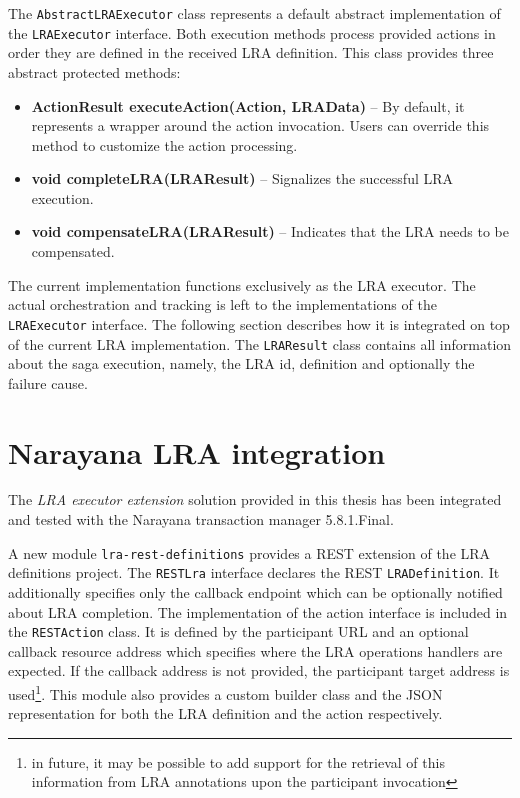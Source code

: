 \documentclass[oneside,
  digital, %
  table,   %
  lof,     %
  lot,     %
]{fithesis3}
\begin{document}
The \texttt{AbstractLRAExecutor} class represents a default abstract implementation of the \texttt{LRAExecutor} interface. Both execution methods process provided actions in order they are defined in the received LRA definition. This class provides three abstract protected methods:

\begin{itemize}
    \item \textbf{ActionResult executeAction(Action, LRAData)} -- By default, it represents a wrapper around the action invocation. Users can override this method to customize the action processing.
    
    \item \textbf{void completeLRA(LRAResult)} -- Signalizes the successful LRA execution.
    
    \item \textbf{void compensateLRA(LRAResult)} -- Indicates that the LRA needs to be compensated.
\end{itemize}

The current implementation functions exclusively as the LRA executor. The actual orchestration and tracking is left to the implementations of the \texttt{LRAExecutor} interface. The following section describes how it is integrated on top of the current LRA implementation. The \texttt{LRAResult} class contains all information about the saga execution, namely, the LRA id, definition and optionally the failure cause.

\section{Narayana LRA integration}
\label{sec:narayana-lra-integration}

The \textit{LRA executor extension} solution provided in this thesis has been integrated and tested with the Narayana transaction manager 5.8.1.Final.

A new module \texttt{lra-rest-definitions} provides a REST extension of the LRA definitions project. The \texttt{RESTLra} interface declares the REST \texttt{LRADefinition}. It additionally specifies only the callback endpoint which can be optionally notified about LRA completion. The implementation of the action interface is included in the \texttt{RESTAction} class. It is defined by the participant URL and an optional callback resource address which specifies where the LRA operations handlers are expected. If the callback address is not provided, the participant target address is used\footnote{in future, it may be possible to add support for the retrieval of this information from LRA annotations upon the participant invocation}. This module also provides a custom builder class and the JSON representation for both the LRA definition and the action respectively.
\end{document}
